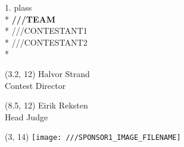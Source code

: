 \documentclass[a4paper]{letter}
\begin{document}
\thispagestyle{empty}


\begin{center}
\vspace*{-4cm}
\end{center}

\begin{center}
\vspace{1cm}
{\Huge 1. plass} \\*
\vspace*{1.5cm}
{\Huge \bf ///TEAM} \\*
\vspace*{0.5cm}
{\LARGE ///CONTESTANT1}\\*
\vspace*{0.2cm}
{\LARGE ///CONTESTANT2}\\*


\end{center}


\begin{textblock}{3}(3.2, 12)
\hspace{0.5cm} \makebox[1.5in]{\hrulefill}
\hspace*{1.2cm} Halvor Strand \\
\hspace*{1cm} Contest Director
\end{textblock}

\begin{textblock}{3}(8.5, 12)
\hspace{0.5cm} \makebox[1.5in]{\hrulefill}
\hspace*{1.3cm} Eirik Reksten\\
\hspace*{1.4cm} Head Judge
\end{textblock}


\begin{textblock}{1}(3, 14)
\texttt{[image: ///SPONSOR1\_IMAGE\_FILENAME]}
\end{textblock}

\end{document}
